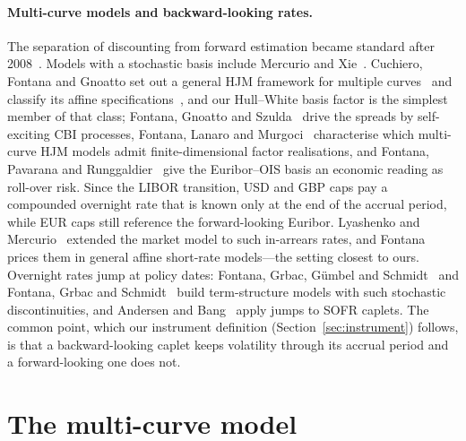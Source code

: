\documentclass[11pt]{article}
\begin{document}
\paragraph{Multi-curve models and backward-looking rates.} The separation of discounting from forward
estimation became standard after 2008~\cite{bianchetti2010,mercurio2010,henrard2026}. Models with a
stochastic basis include Mercurio and Xie~\cite{mercurioxie2012}. Cuchiero, Fontana and Gnoatto set out a general HJM framework for
multiple curves~\cite{fontana2016hjm} and classify its affine specifications~\cite{cfg2019}, and our
Hull--White basis factor is the simplest member of that class; Fontana, Gnoatto and
Szulda~\cite{fontana2021cbi} drive the spreads by self-exciting CBI processes, Fontana, Lanaro and
Murgoci~\cite{fontana2025geometry} characterise which multi-curve HJM models admit
finite-dimensional factor realisations, and Fontana, Pavarana and Runggaldier~\cite{fontana2023rollover}
give the Euribor--OIS basis an economic reading as roll-over risk. Since the
LIBOR transition, USD and GBP caps pay a compounded overnight rate that is known only at the end of
the accrual period, while EUR caps still reference the forward-looking Euribor. Lyashenko and
Mercurio~\cite{lyashenko2019} extended the market model to such in-arrears rates, and
Fontana~\cite{fontana2023caplet} prices them in general affine short-rate models---the setting closest to ours. Overnight rates jump at policy
dates: Fontana, Grbac, G\"umbel and Schmidt~\cite{fontana2020disc} and Fontana, Grbac and
Schmidt~\cite{fontana2024overnight} build term-structure models with such stochastic discontinuities,
and Andersen and Bang~\cite{andersenbang2024} apply jumps to SOFR caplets. The common point, which our instrument definition
(Section~\ref{sec:instrument}) follows, is that a backward-looking caplet keeps volatility through
its accrual period and a forward-looking one does not.

\section{The multi-curve model}
\end{document}

